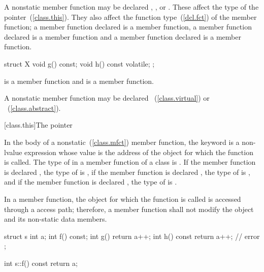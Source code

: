 \pnum
A nonstatic member function may be declared ,
, or  . These
 affect the type of the 
pointer~(\ref{class.this}). They also affect the function
type~(\ref{dcl.fct}) of the member function; a member function declared
 is a  member function, a member function
declared  is a  member function and a
member function declared   is a
 member function.
\enterexample

\begin{codeblock}
struct X {
	void g() const;
	void h() const volatile;
};
\end{codeblock}

 is a  member function and  is a
  member function.
\exitexample

\pnum
A nonstatic member function may be declared
~(\ref{class.virtual}) or ~(\ref{class.abstract}).

[class.this]{The  pointer}%

\pnum
{}%
In the body of a nonstatic~(\ref{class.mfct}) member function, the
keyword  is a non-lvalue expression whose value is the
address of the object for which the function is called.
%
The type of  in a member function of a class  is
.
%
If the member function is declared , the type of
 is  ,
%
if the member function is declared , the type of
 is  , and if the member function
is declared  , the type of  is
  .

\pnum
{}%
In a  member function, the object for which the function is
called is accessed through a  access path; therefore, a
 member function shall not modify the object and its
non-static data members.
\enterexample

\begin{codeblock}
struct s {
    int a;
    int f() const;
    int g() { return a++; }
    int h() const { return a++; }	// error
};

int s::f() const { return a; }
\end{codeblock}

